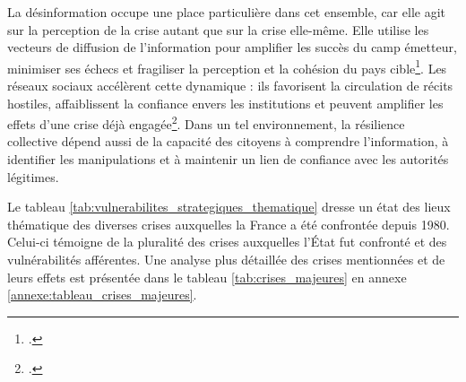 La désinformation occupe une place particulière dans cet ensemble, car elle agit sur la perception de la crise autant que sur la crise elle-même. Elle utilise les vecteurs de diffusion de l'information pour amplifier les succès du camp émetteur, minimiser ses échecs et fragiliser la perception et la cohésion du pays cible\footcite[p.91]{Gere_affrontement_hybride}. Les réseaux sociaux accélèrent cette dynamique : ils favorisent la circulation de récits hostiles, affaiblissent la confiance envers les institutions et peuvent amplifier les effets d'une crise déjà engagée\footcite{Sibony_reseaux_sociaux_et_guerre}. Dans un tel environnement, la résilience collective dépend aussi de la capacité des citoyens à comprendre l'information, à identifier les manipulations et à maintenir un lien de confiance avec les autorités légitimes.

Le tableau \ref{tab:vulnerabilites_strategiques_thematique} dresse un état des lieux thématique des diverses crises auxquelles la France a été confrontée depuis 1980. Celui-ci témoigne de la pluralité des crises auxquelles l'État fut confronté et des vulnérabilités afférentes. Une analyse plus détaillée des crises mentionnées et de leurs effets est présentée dans le tableau \ref{tab:crises_majeures} en annexe \ref{annexe:tableau_crises_majeures}.

